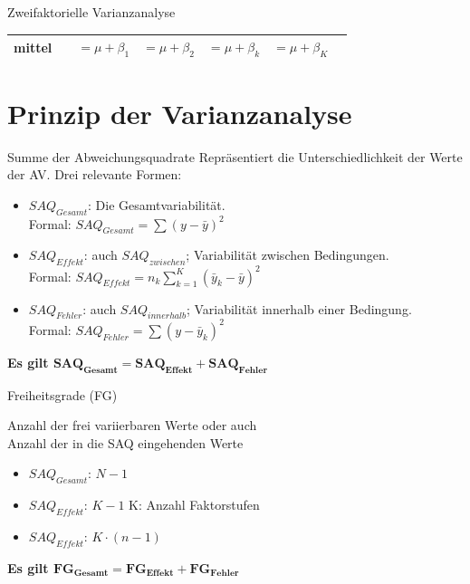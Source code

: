 \documentclass{beamer}
\begin{document}
\begin{frame}{Zweifaktorielle Varianzanalyse}
\begin{table}[]
{\begin{tabular}{|cc|c|c|c|c|c|}
					mittel                &                        & $= \mu + \beta_1$           & $= \mu + \beta_2$           & $= \mu + \beta_k$      & $= \mu + \beta_K$           &                        \\ \hline
				\end{tabular}
			}
			\end{table}
		\end{frame}
	\section{Prinzip der Varianzanalyse}
		
	
	\begin{frame}{Summe der Abweichungsquadrate}
		Repräsentiert die Unterschiedlichkeit der Werte der AV.
		Drei relevante Formen:
		\begin{itemize} \itemsep=2ex
			\item $SAQ_{Gesamt}$: Die Gesamtvariabilität.\\
			Formal: $SAQ_{Gesamt}= \sum(y - \bar{y})^2$
			\item $SAQ_{Effekt}$: auch $SAQ_{zwischen}$; Variabilität zwischen Bedingungen.\\
			Formal: $SAQ_{Effekt} = n_k \sum_{k=1}^{K} (\bar{y}_k - \bar{y})^2$ 
			\item $SAQ_{Fehler}$: auch $SAQ_{innerhalb}$; Variabilität innerhalb einer Bedingung.\\
			Formal: $SAQ_{Fehler} = \sum (y - \bar{y}_k)^2$ 
		\end{itemize}
		\begin{center}
			\textbf{Es gilt $\mathbf{SAQ_{Gesamt} = SAQ_{Effekt} + SAQ_{Fehler}}$}
		\end{center}
	\end{frame}
	
		
	\begin{frame}{Freiheitsgrade (FG)}	
		
		Anzahl der frei variierbaren Werte oder auch \\
		Anzahl der in die SAQ eingehenden Werte
		\begin{itemize}
			\item $SAQ_{Gesamt}$: $N-1$
			\item $SAQ_{Effekt}$: $K-1$ \hspace{3em} K: Anzahl Faktorstufen
			\item $SAQ_{Effekt}$: $K \cdot (n-1)$
		\end{itemize}
		\textbf{Es gilt $\mathbf{FG_{Gesamt} = FG_{Effekt} + FG_{Fehler}}$}

	\end{frame}
	
\end{document}
